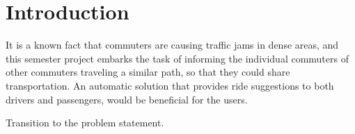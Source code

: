 \chapter{Introduction}\label{ch:introduction}

It is a known fact that commuters are causing traffic jams in dense areas, and this semester project embarks the task of informing the individual commuters of other commuters traveling a similar path, so that they could share transportation. 
An automatic solution that provides ride suggestions to both drivers and passengers, would be beneficial for the users. 

Transition to the problem statement.